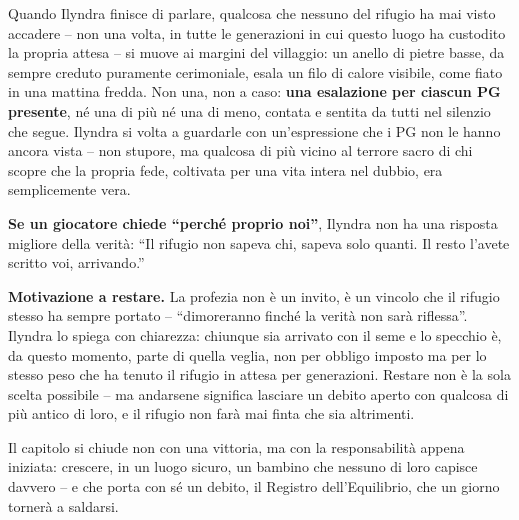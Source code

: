 Quando Ilyndra finisce di parlare, qualcosa che nessuno del rifugio ha mai visto accadere -- non una volta, in tutte le generazioni in cui questo luogo ha custodito la propria attesa -- si muove ai margini del villaggio: un anello di pietre basse, da sempre creduto puramente cerimoniale, esala un filo di calore visibile, come fiato in una mattina fredda. Non una, non a caso: \textbf{una esalazione per ciascun PG presente}, né una di più né una di meno, contata e sentita da tutti nel silenzio che segue. Ilyndra si volta a guardarle con un'espressione che i PG non le hanno ancora vista -- non stupore, ma qualcosa di più vicino al terrore sacro di chi scopre che la propria fede, coltivata per una vita intera nel dubbio, era semplicemente vera.

\textbf{Se un giocatore chiede ``perché proprio noi''}, Ilyndra non ha una risposta migliore della verità: ``Il rifugio non sapeva chi, sapeva solo quanti. Il resto l'avete scritto voi, arrivando.''

\textbf{Motivazione a restare.} La profezia non è un invito, è un vincolo che il rifugio stesso ha sempre portato -- ``dimoreranno finché la verità non sarà riflessa''. Ilyndra lo spiega con chiarezza: chiunque sia arrivato con il seme e lo specchio è, da questo momento, parte di quella veglia, non per obbligo imposto ma per lo stesso peso che ha tenuto il rifugio in attesa per generazioni. Restare non è la sola scelta possibile -- ma andarsene significa lasciare un debito aperto con qualcosa di più antico di loro, e il rifugio non farà mai finta che sia altrimenti.

Il capitolo si chiude non con una vittoria, ma con la responsabilità appena iniziata: crescere, in un luogo sicuro, un bambino che nessuno di loro capisce davvero -- e che porta con sé un debito, il Registro dell'Equilibrio, che un giorno tornerà a saldarsi.
